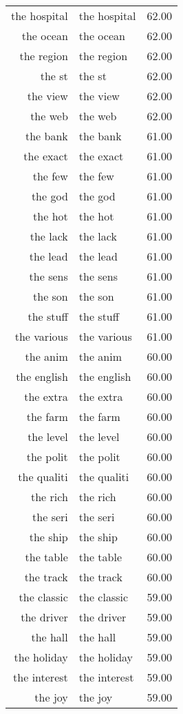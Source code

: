 \begin{table}[ht]
\begin{tabular}{rlr}
  the hospital & the hospital & 62.00 \\ 
  the ocean & the ocean & 62.00 \\ 
  the region & the region & 62.00 \\ 
  the st & the st & 62.00 \\ 
  the view & the view & 62.00 \\ 
  the web & the web & 62.00 \\ 
  the bank & the bank & 61.00 \\ 
  the exact & the exact & 61.00 \\ 
  the few & the few & 61.00 \\ 
  the god & the god & 61.00 \\ 
  the hot & the hot & 61.00 \\ 
  the lack & the lack & 61.00 \\ 
  the lead & the lead & 61.00 \\ 
  the sens & the sens & 61.00 \\ 
  the son & the son & 61.00 \\ 
  the stuff & the stuff & 61.00 \\ 
  the various & the various & 61.00 \\ 
  the anim & the anim & 60.00 \\ 
  the english & the english & 60.00 \\ 
  the extra & the extra & 60.00 \\ 
  the farm & the farm & 60.00 \\ 
  the level & the level & 60.00 \\ 
  the polit & the polit & 60.00 \\ 
  the qualiti & the qualiti & 60.00 \\ 
  the rich & the rich & 60.00 \\ 
  the seri & the seri & 60.00 \\ 
  the ship & the ship & 60.00 \\ 
  the table & the table & 60.00 \\ 
  the track & the track & 60.00 \\ 
  the classic & the classic & 59.00 \\ 
  the driver & the driver & 59.00 \\ 
  the hall & the hall & 59.00 \\ 
  the holiday & the holiday & 59.00 \\ 
  the interest & the interest & 59.00 \\ 
  the joy & the joy & 59.00 \\ 

\end{tabular}
\end{table}
